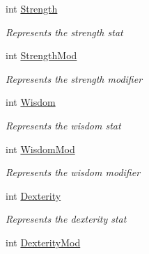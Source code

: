 \begin{DoxyCompactItemize}
int \mbox{\hyperlink{class_dungeons__n___dragons___manager_1_1_models_1_1_character_a3936c52686f69e64301e6c1d8e0bdf7e}{Strength}}
\begin{DoxyCompactList}\small\item\em Represents the strength stat \end{DoxyCompactList}\item 
int \mbox{\hyperlink{class_dungeons__n___dragons___manager_1_1_models_1_1_character_a77529eaf0ef81c0ee45d5832cc2fa063}{Strength\+Mod}}
\begin{DoxyCompactList}\small\item\em Represents the strength modifier \end{DoxyCompactList}\item 
int \mbox{\hyperlink{class_dungeons__n___dragons___manager_1_1_models_1_1_character_a2ef45715109a4a63acf9016e665b4e21}{Wisdom}}
\begin{DoxyCompactList}\small\item\em Represents the wisdom stat \end{DoxyCompactList}\item 
int \mbox{\hyperlink{class_dungeons__n___dragons___manager_1_1_models_1_1_character_a71766d52f855bf347ffa1b12a3bc2202}{Wisdom\+Mod}}
\begin{DoxyCompactList}\small\item\em Represents the wisdom modifier \end{DoxyCompactList}\item 
int \mbox{\hyperlink{class_dungeons__n___dragons___manager_1_1_models_1_1_character_adec4734939ae0bb9070aef3fd1d82024}{Dexterity}}
\begin{DoxyCompactList}\small\item\em Represents the dexterity stat \end{DoxyCompactList}\item 
int \mbox{\hyperlink{class_dungeons__n___dragons___manager_1_1_models_1_1_character_a46c40a91cffab76e67527e2312a93a09}{Dexterity\+Mod}}

\end{DoxyCompactItemize}
